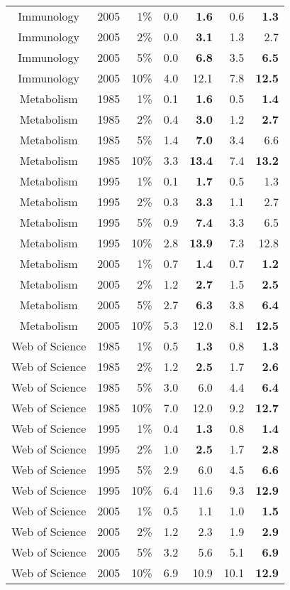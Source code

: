 \documentclass[11pt, oneside]{article}   	%
\begin{document}
\begin{itemize}
\begin{enumerate}
\begin{table}
\begin{centering}
{\begin{tabular}{|c crrrr r|}
Immunology & 2005&1\%& 0.0& \bf{1.6}& 0.6& \bf{1.3} \\ 
Immunology & 2005&2\%& 0.0& \bf{3.1}& 1.3& 2.7 \\ 
Immunology & 2005&5\%& 0.0& \bf{6.8}& 3.5& \bf{6.5} \\ 
Immunology & 2005&10\%& 4.0& 12.1& 7.8& \bf{12.5} \\ 
\hline
Metabolism & 1985&1\%& 0.1& \bf{1.6}& 0.5& \bf{1.4} \\ 
Metabolism & 1985&2\%& 0.4& \bf{3.0}& 1.2& \bf{2.7} \\ 
Metabolism & 1985&5\%& 1.4& \bf{7.0} & 3.4& 6.6 \\ 
Metabolism & 1985&10\%& 3.3& \bf{13.4} & 7.4& \bf{13.2} \\ 
Metabolism & 1995&1\%& 0.1& \bf{1.7} & 0.5& 1.3 \\ 
Metabolism & 1995&2\%& 0.3& \bf{3.3}& 1.1& 2.7 \\ 
Metabolism & 1995&5\%& 0.9& \bf{7.4} & 3.3& 6.5 \\ 
Metabolism & 1995&10\%& 2.8& \bf{13.9}& 7.3& 12.8 \\ 
Metabolism & 2005&1\%& 0.7& \bf{1.4}& 0.7& \bf{1.2} \\ 
Metabolism & 2005&2\%& 1.2& \bf{2.7}& 1.5& \bf{2.5} \\ 
Metabolism & 2005&5\%& 2.7& \bf{6.3} & 3.8& \bf{6.4} \\ 
Metabolism & 2005&10\%& 5.3& 12.0& 8.1& \bf{12.5} \\ 
\hline
Web of Science & 1985&1\%& 0.5& \bf{1.3}& 0.8& \bf{1.3} \\ 
Web of Science & 1985&2\%& 1.2& \bf{2.5}& 1.7& \bf{2.6} \\ 
Web of Science & 1985&5\%& 3.0& 6.0& 4.4& \bf{6.4} \\ 
Web of Science & 1985&10\%& 7.0& 12.0& 9.2& \bf{12.7} \\ 
Web of Science & 1995&1\%& 0.4& \bf{1.3}& 0.8& \bf{1.4} \\ 
Web of Science & 1995&2\%& 1.0& \bf{2.5}& 1.7& \bf{2.8} \\ 
Web of Science & 1995&5\%& 2.9& 6.0& 4.5& \bf{6.6} \\ 
Web of Science & 1995&10\%& 6.4& 11.6& 9.3& \bf{12.9} \\ 
Web of Science & 2005&1\%& 0.5& 1.1& 1.0& \bf{1.5} \\ 
Web of Science & 2005&2\%& 1.2& 2.3& 1.9& \bf{2.9} \\ 
Web of Science & 2005&5\%& 3.2& 5.6& 5.1& \bf{6.9} \\ 
Web of Science & 2005&10\%& 6.9& 10.9& 10.1& \bf{12.9} \\ 

\end{tabular}}
\end{centering}
\end{table}
\end{enumerate}
\end{itemize}
\end{document}
